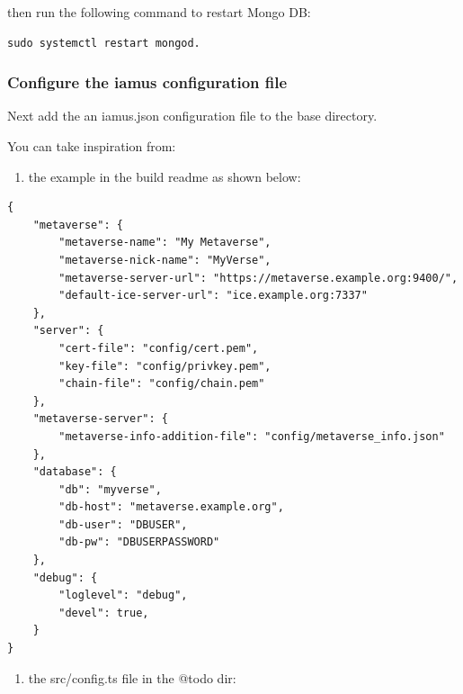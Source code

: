 then run the following command to restart Mongo DB:

\begin{verbatim}
sudo systemctl restart mongod.
\end{verbatim}

\hypertarget{configure-the-iamus-configuration-file}{%
\subsubsection{Configure the iamus configuration
file}\label{configure-the-iamus-configuration-file}}

Next add the an iamus.json configuration file to the base directory.

You can take inspiration from:

\begin{enumerate}
\def\labelenumi{\arabic{enumi})}

\item
  the example in the build readme as shown below:
\end{enumerate}

\begin{verbatim}
{
    "metaverse": {
        "metaverse-name": "My Metaverse",
        "metaverse-nick-name": "MyVerse",
        "metaverse-server-url": "https://metaverse.example.org:9400/",
        "default-ice-server-url": "ice.example.org:7337"
    },
    "server": {
        "cert-file": "config/cert.pem",
        "key-file": "config/privkey.pem",
        "chain-file": "config/chain.pem"
    },
    "metaverse-server": {
        "metaverse-info-addition-file": "config/metaverse_info.json"
    },
    "database": {
        "db": "myverse",
        "db-host": "metaverse.example.org",
        "db-user": "DBUSER",
        "db-pw": "DBUSERPASSWORD"
    },
    "debug": {
        "loglevel": "debug",
        "devel": true,
    }
}
\end{verbatim}

\begin{enumerate}
\def\labelenumi{\arabic{enumi})}
\setcounter{enumi}{1}

\item
  the src/config.ts file in the @todo dir:
\end{enumerate}

